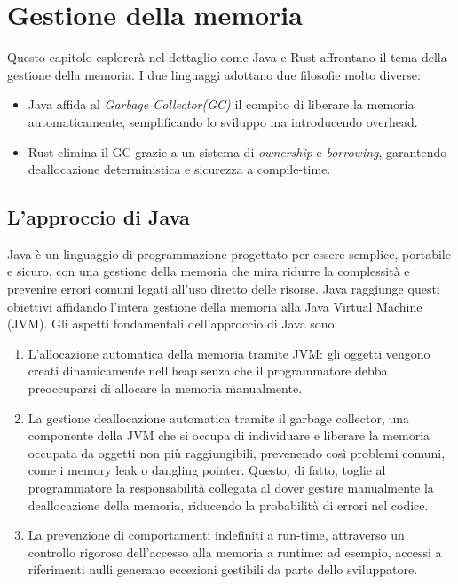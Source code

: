 
\chapter{Gestione della memoria}
Questo capitolo esplorerà nel dettaglio come Java e Rust affrontano il tema della gestione della memoria. I due linguaggi adottano due filosofie molto diverse:
\begin{itemize}
    \item Java affida al \textit{Garbage Collector(GC)} il compito di liberare la memoria automaticamente, semplificando lo sviluppo ma introducendo overhead. 
    \item Rust elimina il GC grazie a un sistema di \textit{ownership} e \textit{borrowing}, garantendo deallocazione deterministica e sicurezza a compile-time. 
\end{itemize}
\section{L'approccio di Java}
Java è un linguaggio di programmazione progettato per essere semplice, portabile e sicuro, con una gestione della memoria che mira ridurre la complessità e prevenire errori comuni legati all'uso diretto delle risorse. Java raggiunge questi obiettivi affidando l'intera gestione della memoria alla Java Virtual Machine (JVM). Gli aspetti fondamentali dell'approccio di Java sono:

\begin{enumerate}
\item L'allocazione automatica della memoria tramite JVM: gli oggetti vengono creati dinamicamente nell'heap senza che il programmatore debba preoccuparsi di allocare la memoria manualmente. 
\item La gestione deallocazione automatica tramite il garbage collector, una componente della JVM che si occupa di individuare e liberare la memoria occupata da oggetti non più raggiungibili, prevenendo così problemi comuni, come i memory leak o dangling pointer. Questo, di fatto, toglie al programmatore la responsabilità collegata al dover gestire manualmente la deallocazione della memoria, riducendo la probabilità di errori nel codice.
\item La prevenzione di comportamenti indefiniti a run-time, attraverso un controllo rigoroso dell'accesso alla memoria a runtime: ad esempio, accessi a riferimenti nulli generano eccezioni gestibili da parte dello sviluppatore. 
\end{enumerate}

